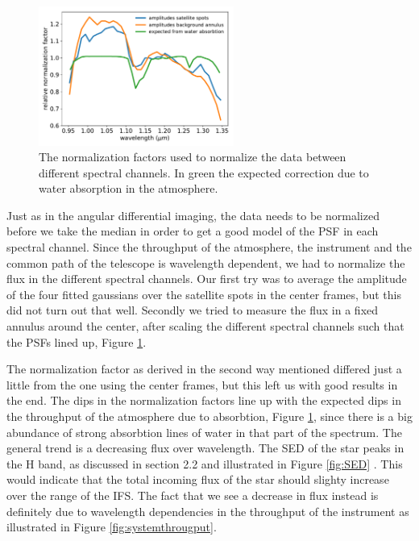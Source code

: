 \documentclass[twoside,single]{lion-msc}
\begin{document}
\begin{figure}
\centering
\includegraphics[width = 0.57\textwidth]{allnormalization}
\caption{The normalization factors used to normalize the data between different spectral channels. In green the expected correction due to water absorption in the atmosphere.}
\label{fig:throughputnorm}
\end{figure}

\noindent
Just as in the angular differential imaging, the data needs to be normalized before we take the median in order to get a good model of the PSF in each spectral channel. Since the throughput of the atmosphere, the instrument and the common path of the telescope is wavelength dependent, we had to normalize the flux in the different spectral channels. Our first try was to average the amplitude of the four fitted gaussians over the satellite spots in the center frames, but this did not turn out that well. Secondly we tried to measure the flux in a fixed annulus around the center, after scaling the different spectral channels such that the PSFs lined up, Figure \ref{fig:throughputnorm}.
\bigskip

The normalization factor as derived in the second way mentioned differed just a little from the one using the center frames, but this left us with good results in the end. The dips in the normalization factors line up with the expected dips in the throughput of the atmosphere due to absorbtion, Figure \ref{fig:throughputnorm}, since there is a big abundance of strong absorbtion lines of water in that part of the spectrum. The general trend is a decreasing flux over wavelength. The SED of the star peaks in the H band, as discussed in section 2.2 and illustrated in Figure \ref{fig:SED} \citep{Padgett}. This would indicate that the total incoming flux of the star should slighty increase over the range of the IFS. The fact that we see a decrease in flux instead is definitely due to wavelength dependencies in the throughput of the instrument as illustrated in Figure \ref{fig:systemthrougput}. 
\end{document}
